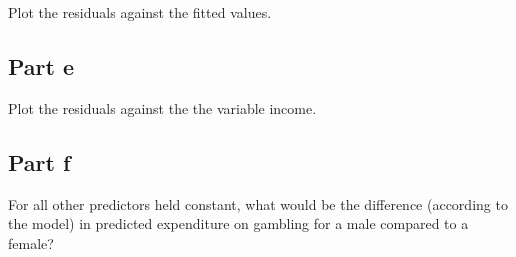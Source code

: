 \begin{question}
    Plot the residuals against the fitted values.
\end{question}

\begin{answer}
    
\end{answer}

\subsection{Part e}

\begin{question}
    Plot the residuals against the the variable income.
\end{question}

\begin{answer}
    
\end{answer}

\subsection{Part f}

\begin{question}
    For all other predictors held constant, what would be the difference (according to the model) in predicted expenditure on gambling for a male compared to a female?
\end{question}

\begin{answer}
    
\end{answer}
